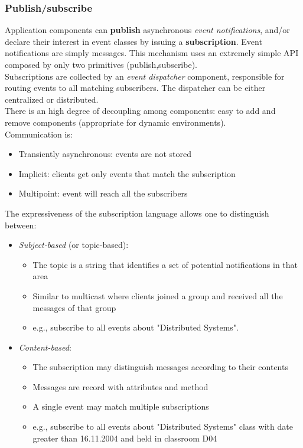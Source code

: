 \documentclass[10pt,a4paper]{article}
\begin{document}
\subsubsection{Publish/subscribe}
Application components can \textbf{publish} asynchronous \textit{event notifications}, and/or declare their interest in event classes by issuing a \textbf{subscription}. Event notifications are simply messages. This mechanism uses an extremely simple API composed by only two primitives (publish,subscribe). \\
Subscriptions are collected by an \textit{event dispatcher} component, responsible for routing events to all matching subscribers. The dispatcher can be either centralized or distributed. \\
There is an high degree of decoupling among components: easy to add and remove components (appropriate for dynamic environments). \\
Communication is:
\begin{itemize}
	\item Transiently asynchronous: events are not stored
	\item Implicit: clients get only events that match the subscription
	\item Multipoint: event will reach all the subscribers
\end{itemize}
The expressiveness of the subscription language allows one to distinguish between:
\begin{itemize}
	\item \textit{Subject-based} (or topic-based): 
	\begin{itemize}
		\item The topic is a string that identifies a set of potential notifications in that area
		\item Similar to multicast where clients joined a group and received all the messages of that group
		\item e.g., subscribe to all events about "Distributed Systems".
	\end{itemize}
	\item \textit{Content-based}:
	\begin{itemize}
		\item The subscription may distinguish messages according to their contents
		\item Messages are record with attributes and method
		\item A single event may match multiple subscriptions
		\item e.g., subscribe to all events about "Distributed Systems" class with date greater than 16.11.2004 and held in classroom D04
	\end{itemize}
\end{itemize}
\end{document}
